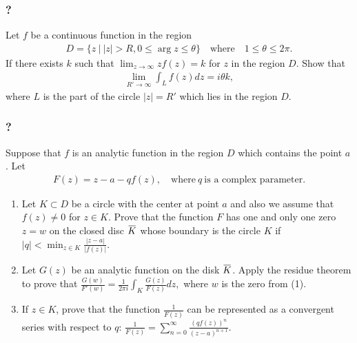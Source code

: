 \hypertarget{section-83}{%
\subsubsection{?}\label{section-83}}

Let \(f\) be a continuous function in the region
\begin{align*}D=\{z {~\mathrel{\Big|}~}{\left\lvert {z} \right\rvert}>R, 0\leq \arg z\leq \theta\}\quad\text{where}\quad
1\leq \theta \leq 2\pi.\end{align*}
If there exists \(k\) such that
\(\displaystyle{\lim_{z\to\infty} zf(z)=k}\) for \(z\) in the region
\(D\). Show that
\begin{align*}\lim_{R'\to\infty} \int_{L} f(z) dz=i\theta k,\end{align*}
where \(L\) is the part of the circle \(|z|=R'\) which lies in the
region \(D\).

\hypertarget{section-84}{%
\subsubsection{?}\label{section-84}}

Suppose that \(f\) is an analytic function in the region \(D\) which
contains the point \(a\). Let
\begin{align*}F(z)= z-a-qf(z),\quad \text{where}~ q \ \text{is a complex
parameter}.\end{align*}

\begin{enumerate}
\def\labelenumi{(\arabic{enumi})}
\item
  Let \(K\subset D\) be a circle with the center at point \(a\) and also
  we assume that \(f(z)\not =0\) for \(z\in K\). Prove that the function
  \(F\) has one and only one zero \(z=w\) on the closed disc
  \(\mkern 1.5mu\overline{\mkern-1.5muK\mkern-1.5mu}\mkern 1.5mu\) whose
  boundary is the circle \(K\) if
  \(\displaystyle{ |q|<\min_{z\in K} \frac{|z-a|}{|f(z)|}.}\)\\
\item
  Let \(G(z)\) be an analytic function on the disk
  \(\mkern 1.5mu\overline{\mkern-1.5muK\mkern-1.5mu}\mkern 1.5mu\).
  Apply the residue theorem to prove that
  \(\displaystyle{ \frac{G(w)}{F'(w)}=\frac{1}{2\pi i}\int_K \frac{G(z)}{F(z)} dz,}\)
  where \(w\) is the zero from (1).\\
\item
  If \(z\in K\), prove that the function
  \(\displaystyle{\frac{1}{F(z)}}\) can be represented as a convergent
  series with respect to \(q\):
  \(\displaystyle{ \frac{1}{F(z)}=\sum_{n=0}^{\infty} \frac{(qf(z))^n}{(z-a)^{n+1}}.}\)
\end{enumerate}

